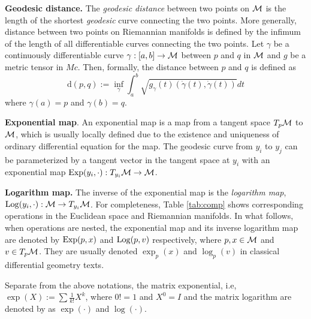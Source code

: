 \textbf{Geodesic distance.} The \textit{geodesic distance}
between two points on $\mathcal{M}$ is the length of the shortest {\em geodesic} curve connecting the two points. More generally, distance between two points on Riemannian manifolds is defined by the infimum of the length of all differentiable curves connecting the two points. Let $\gamma$ be a continuously differentiable curve $\gamma:[a,b] \rightarrow \mathcal{M}$ between $p$ and $q$ in $\mathcal{M}$ and $g$ be a metric tensor in $Mc$.
Then, formally, the distance between $p$ and $q$ is defined as
\begin{equation}
\text{d}(p,q) := \inf_\gamma \int_a^b \sqrt{g_\gamma(t) (\dot{\gamma}(t), \dot{\gamma}(t))} dt
\end{equation}
where $\gamma(a)=p$ and $\gamma(b)=q$.

\textbf{Exponential map}. An exponential map is a map from a tangent space $T_p\mathcal{M}$  to $\mathcal{M}$, which is usually locally defined due to the existence and uniqueness of ordinary differential equation for the map. The geodesic curve from $y_i$ to $y_j$ can be parameterized by a tangent vector in the tangent space at $y_i$ with an exponential map $\operatorname*{Exp}(y_i,\cdot ): T_{y_i}\mathcal{M} \rightarrow \mathcal{M}$. 


\textbf{Logarithm map.}
The inverse of the exponential map is the \textit{logarithm map}, $\operatorname*{Log}(y_i,\cdot):\mathcal{M} \rightarrow T_{y_i}\mathcal{M}$. 
For completeness, Table \ref{tab:comp} shows corresponding operations in the Euclidean space and Riemannian manifolds.
In what follows, when operations are nested, the exponential map and its inverse logarithm map are denoted by $\operatorname*{Exp}(p, x)$ and $\operatorname*{Log}(p, v)$ respectively, where $p, x \in \mathcal{M}$ and $v\in T_p\mathcal{M}$. They are usually denoted $\exp_p(x)$ and $\log_p(v)$ in classical differential geometry texts. 
 
Separate from the above notations, the matrix exponential, i.e, $\exp(X):= \sum \frac{1}{k!} X^k$, where $0!=1$ and $X^0=I$  and the matrix logarithm are denoted by as $\exp(\cdot)$ and $\log(\cdot)$. 


